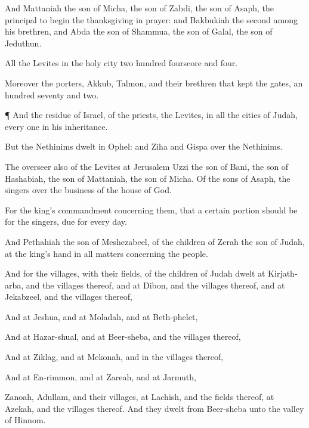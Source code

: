 {And
Mattaniah the
son of
Micha, the
son of
Zabdi, the
son of
Asaph,
{} the
principal to
begin the
thanksgiving in
prayer: and
Bakbukiah the
second among his
brethren, and
Abda the
son of
Shammua, the
son of
Galal, the
son of
Jeduthun.

All the
Levites in the
holy
city
{} two
hundred
fourscore and
four.

Moreover the
porters,
Akkub,
Talmon, and their
brethren that
kept the
gates,
{} an
hundred
seventy and
two.


\par }{\PP {}¶ And the
residue of
Israel, of the
priests,
{} the
Levites,
{} in all the
cities of
Judah, every
one in his
inheritance.

But the
Nethinims
dwelt in
Ophel: and
Ziha and
Gispa
{} over the
Nethinims.

The
overseer also of the
Levites at
Jerusalem
{}
Uzzi the
son of
Bani, the
son of
Hashabiah, the
son of
Mattaniah, the
son of
Micha. Of the
sons of
Asaph, the
singers
{}
over the
business of the
house of
God.

For
{} the
king’s
commandment concerning them, that a certain
portion should be for the
singers,
due for every
day.

And
Pethahiah the
son of
Meshezabeel, of the
children of
Zerah the
son of
Judah,
{} at the
king’s
hand in all
matters concerning the
people.

And for the
villages, with their
fields,
{} of the
children of
Judah
dwelt at
Kirjath-arba, and
{} the
villages thereof, and at
Dibon, and
{} the
villages thereof, and at
Jekabzeel, and
{} the
villages thereof,

And at
Jeshua, and at
Moladah, and at
Beth-phelet,

And at
Hazar-shual, and at
Beer-sheba, and
{} the
villages thereof,

And at
Ziklag, and at
Mekonah, and in the
villages thereof,

And at
En-rimmon, and at
Zareah, and at
Jarmuth,

Zanoah,
Adullam, and
{} their
villages, at
Lachish, and the
fields thereof, at
Azekah, and
{} the
villages thereof. And they
dwelt from
Beer-sheba unto the
valley of
Hinnom.

}
